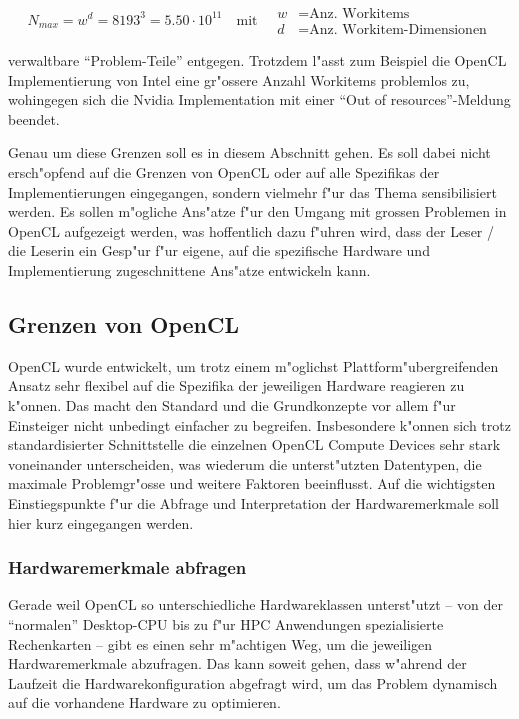 \begin{refsection}
\[
	N_{max} = w^d = 8193^{3} = 5.50 \cdot 10^{11} \quad\textrm{mit}\quad
	\begin{aligned}
		w &= \textrm{Anz. Workitems}\\
		d &= \textrm{Anz. Workitem-Dimensionen}
	\end{aligned}
\]

\noindent verwaltbare ``Problem-Teile'' entgegen. Trotzdem l"asst zum Beispiel
die OpenCL Implementierung von Intel eine gr"ossere Anzahl Workitems problemlos
zu, wohingegen sich die Nvidia Implementation mit einer ``Out of
resources''-Meldung beendet.

Genau um diese Grenzen soll es in diesem Abschnitt gehen. Es soll dabei nicht
ersch"opfend auf die Grenzen von OpenCL oder auf alle Spezifikas der
Implementierungen eingegangen, sondern vielmehr f"ur das Thema sensibilisiert
werden. Es sollen m"ogliche Ans"atze f"ur den Umgang mit grossen Problemen in
OpenCL aufgezeigt werden, was hoffentlich dazu f"uhren wird, dass der Leser /
die Leserin ein Gesp"ur f"ur eigene, auf die spezifische Hardware und
Implementierung zugeschnittene Ans"atze entwickeln kann.


\subsection{Grenzen von OpenCL}

OpenCL wurde entwickelt, um trotz einem m"oglichst Plattform"ubergreifenden
Ansatz sehr flexibel auf die Spezifika der jeweiligen Hardware reagieren zu
k"onnen. Das macht den Standard und die Grundkonzepte vor allem f"ur Einsteiger
nicht unbedingt einfacher zu begreifen. Insbesondere k"onnen sich trotz
standardisierter Schnittstelle die einzelnen OpenCL Compute Devices sehr stark
voneinander unterscheiden, was wiederum die unterst"utzten Datentypen, die
maximale Problemgr"osse und weitere Faktoren beeinflusst. Auf die wichtigsten
Einstiegspunkte f"ur die Abfrage und Interpretation der Hardwaremerkmale soll
hier kurz eingegangen werden.


\subsubsection{Hardwaremerkmale abfragen}

Gerade weil OpenCL so unterschiedliche Hardwareklassen unterst"utzt -- von der
``normalen'' Desktop-CPU bis zu f"ur HPC Anwendungen spezialisierte Rechenkarten
-- gibt es einen sehr m"achtigen Weg, um die jeweiligen Hardwaremerkmale
abzufragen.  Das kann soweit gehen, dass w"ahrend der Laufzeit die
Hardwarekonfiguration abgefragt wird, um das Problem dynamisch auf die
vorhandene Hardware zu optimieren.


\end{refsection}
